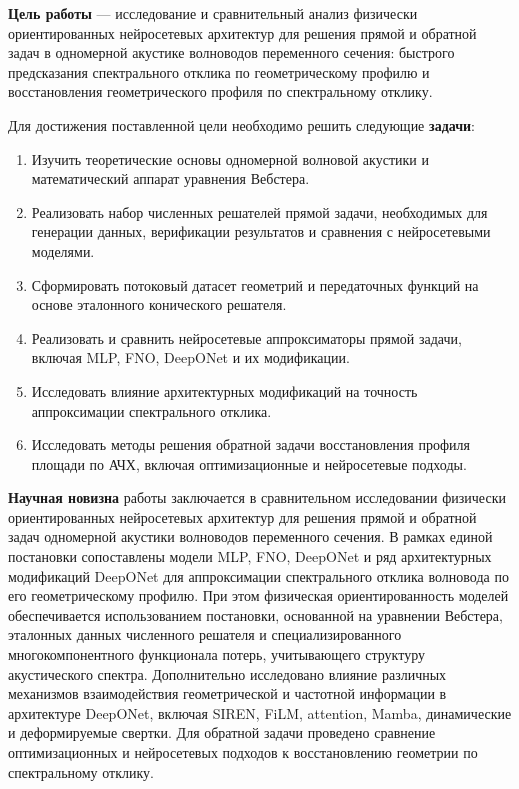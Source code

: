 \textbf{Цель работы} --- исследование и сравнительный анализ физически ориентированных нейросетевых архитектур для решения прямой и обратной задач в одномерной акустике волноводов переменного сечения: быстрого предсказания спектрального отклика по геометрическому профилю и восстановления геометрического профиля по спектральному отклику.

Для достижения поставленной цели необходимо решить следующие \textbf{задачи}:
\begin{enumerate}
    \item Изучить теоретические основы одномерной волновой акустики и математический аппарат уравнения Вебстера.
    \item Реализовать набор численных решателей прямой задачи, необходимых для генерации данных, верификации результатов и сравнения с нейросетевыми моделями.
    \item Сформировать потоковый датасет геометрий и передаточных функций на основе эталонного конического решателя.
    \item Реализовать и сравнить нейросетевые аппроксиматоры прямой задачи, включая MLP, FNO, DeepONet и их модификации.
    \item Исследовать влияние архитектурных модификаций на точность аппроксимации спектрального отклика.
    \item Исследовать методы решения обратной задачи восстановления профиля площади по АЧХ, включая оптимизационные и нейросетевые подходы.
\end{enumerate}

\textbf{Научная новизна} работы заключается в сравнительном исследовании физически ориентированных нейросетевых архитектур для решения прямой и обратной задач одномерной акустики волноводов переменного сечения. В рамках единой постановки сопоставлены модели MLP, FNO, DeepONet и ряд архитектурных модификаций DeepONet для аппроксимации спектрального отклика волновода по его геометрическому профилю. При этом физическая ориентированность моделей обеспечивается использованием постановки, основанной на уравнении Вебстера, эталонных данных численного решателя и специализированного многокомпонентного функционала потерь, учитывающего структуру акустического спектра. Дополнительно исследовано влияние различных механизмов взаимодействия геометрической и частотной информации в архитектуре DeepONet, включая SIREN, FiLM, attention, Mamba, динамические и деформируемые свертки. Для обратной задачи проведено сравнение оптимизационных и нейросетевых подходов к восстановлению геометрии по спектральному отклику.

